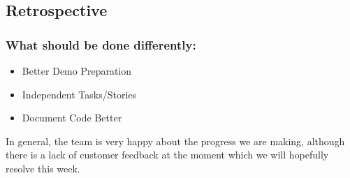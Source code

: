 \documentclass[11pt,a4paper]{article}
\begin{document}
\newpage
\subsection{Retrospective}
\subsubsection*{What should be done differently:}
\begin{itemize}
\item Better Demo Preparation
\item Independent Tasks/Stories
\item Document Code Better
\end{itemize}

In general, the team is very happy about the progress we are making, although
there is a lack of customer feedback at the moment which we will hopefully
resolve this week.
\end{document}
